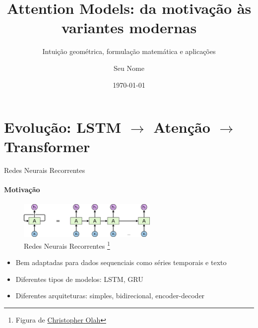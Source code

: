 \documentclass{beamer}
\title{Attention Models: da motivação às variantes modernas}
\subtitle{Intuição geométrica, formulação matemática e aplicações}
\author{Seu Nome}
\date{\today}
\begin{document}
\maketitle


\section{Evolução: LSTM \texorpdfstring{$\rightarrow$}{->} Atenção \texorpdfstring{$\rightarrow$}{->} Transformer}


\begin{frame}{Redes Neurais Recorrentes}
	\framesubtitle{Motivação}

	\begin{figure}[h]
		\centering
		\includegraphics[width=0.6\textwidth]{assets/colah-RNN-unrolled.png}
		\caption{Redes Neurais Recorrentes \footnote{Figura de \href{https://colah.github.io/posts/2015-08-Understanding-LSTMs/}{Christopher Olah}}}
	\end{figure}

	\begin{itemize}
		\item Bem adaptadas para dados sequenciais como séries temporais e texto
		\item Diferentes tipos de modelos: LSTM, GRU
		\item Diferentes arquiteturas: simples, bidirecional, encoder-decoder
	\end{itemize}

\end{frame}
\end{document}
